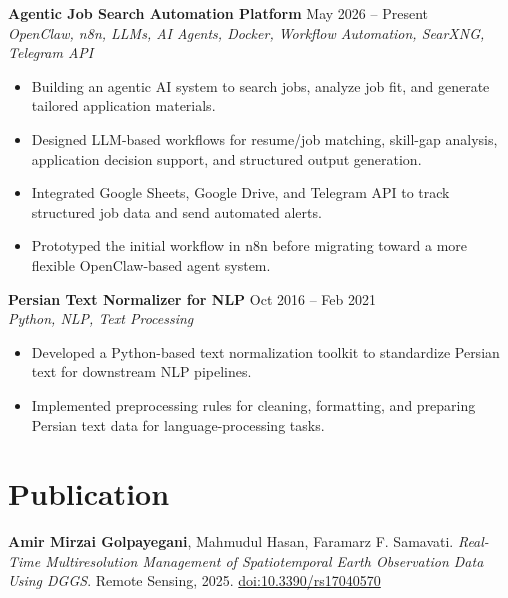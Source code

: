 \documentclass[a4paper,10pt]{article}
\newcommand{\resumeSubheading}[4]{
    \textbf{#1} \hfill #2 \\
    \textit{#3} \hfill \textit{#4}
}
\begin{document}
\noindent
\textbf{Agentic Job Search Automation Platform} \hfill May 2026 -- Present \\
\textit{OpenClaw, n8n, LLMs, AI Agents, Docker, Workflow Automation, SearXNG, Telegram API}
\begin{itemize}[leftmargin=0.25in]
    \item Building an agentic AI system to search jobs, analyze job fit, and generate tailored application materials.
    \item Designed LLM-based workflows for resume/job matching, skill-gap analysis, application decision support, and structured output generation.
    \item Integrated Google Sheets, Google Drive, and Telegram API to track structured job data and send automated alerts.
    \item Prototyped the initial workflow in n8n before migrating toward a more flexible OpenClaw-based agent system.
\end{itemize}

\noindent
\textbf{Persian Text Normalizer for NLP} \hfill Oct 2016 -- Feb 2021 \\
\textit{Python, NLP, Text Processing}
\begin{itemize}[leftmargin=0.25in]
    \item Developed a Python-based text normalization toolkit to standardize Persian text for downstream NLP pipelines.
    \item Implemented preprocessing rules for cleaning, formatting, and preparing Persian text data for language-processing tasks.
\end{itemize}

\section*{Publication}

\textbf{Amir Mirzai Golpayegani}, Mahmudul Hasan, Faramarz F. Samavati. 
\textit{Real-Time Multiresolution Management of Spatiotemporal Earth Observation Data Using DGGS}. 
Remote Sensing, 2025. \href{https://doi.org/10.3390/rs17040570}{doi:10.3390/rs17040570}



\end{document}
